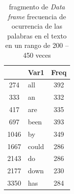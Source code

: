 \documentclass{article}
\begin{document}
\begin{table}[htbp]
  \centering
  \caption{fragmento de \textit{Data frame} frecuencia de ocurrencia de las palabras en el texto en un rango de 200 -- 450 veces}
    \begin{tabular}{clc}
    \toprule
          & \textbf{Var1} & \multicolumn{1}{l}{\textbf{Freq}} \\
    \midrule
    274   & all   & 392 \\
    333   & an    & 332 \\
    417   & are   & 335 \\
    697   & been  & 393 \\
    1046  & by    & 349 \\
    1667  & could & 286 \\
    2143  & do    & 286 \\
    2177  & down  & 230 \\
    3350  & has   & 284 \\
    \bottomrule
    \end{tabular}%
  \label{tab:5}%
\end{table}%
\end{document}
